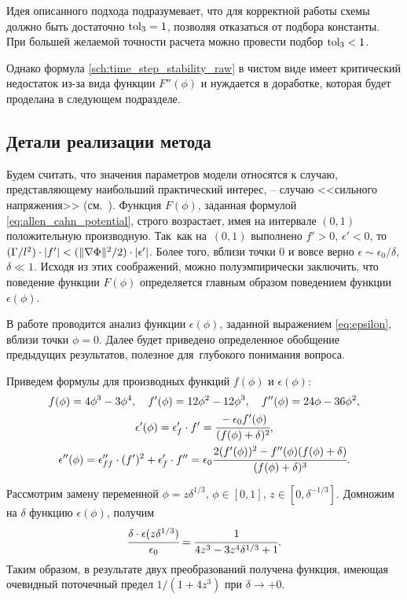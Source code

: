 Идея описанного подхода подразумевает, что для корректной работы схемы должно быть достаточно ${\text{tol}}_3 = 1$, позволяя отказаться от подбора константы. При большей желаемой точности расчета можно провести подбор ${\text{tol}}_3 < 1$.

Однако формула \eqref{sch:time_step_stability_raw} в чистом виде имеет критический недостаток из-за вида функции $F''(\phi)$ и нуждается в доработке, которая будет проделана в следующем подразделе.


\subsection{Детали реализации метода}

Будем считать, что значения параметров модели относятся к случаю, представляющему наибольший практический интерес, -- случаю <<сильного напряжения>> (см.~\cite{ponomarev_stability}). Функция $F(\phi)$, заданная формулой \eqref{eq:allen_cahn_potential}, строго возрастает, имея на интервале $(0, 1)$ положительную производную. Так~как на~$(0, 1)$ выполнено $f' > 0$, $\epsilon' < 0$, то $(\Gamma / l^2) \cdot |f'| \hm < (\norm{\nabla \Phi}^2 / 2) \cdot |\epsilon'|$. Более того, вблизи точки $0$ и вовсе верно $\epsilon \sim \epsilon_0 / \delta$, $\delta \ll 1$. Исходя из этих соображений, можно полуэмпирически заключить, что поведение функции $F(\phi)$ определяется главным образом поведением функции~$\epsilon(\phi)$.

В работе \cite{ponomarev_stability} проводится анализ функции $\epsilon(\phi)$, заданной выражением \eqref{eq:epsilon}, вблизи точки $\phi = 0$. Далее будет приведено определенное обобщение предыдущих результатов, полезное для~глубокого понимания вопроса.

Приведем формулы для производных функций $f(\phi)$ и $\epsilon(\phi)$:
\begin{gather}
	f(\phi) = 4 \phi^3 - 3 \phi^4, \quad f'(\phi) = 12 \phi^2 - 12 \phi^3, \quad f''(\phi) = 24 \phi - 36 \phi^2,
	\nonumber \\
	\epsilon'(\phi) = \epsilon'_f \cdot f' = \cfrac{-\epsilon_0 f'(\phi)}{(f(\phi) + \delta)^2},
	\nonumber \\
	\epsilon''(\phi) = \epsilon''_{ff} \cdot (f')^2 + \epsilon'_f \cdot f'' = \epsilon_0 \cfrac{2 (f'(\phi))^2 - f''(\phi)(f(\phi) + \delta)}{(f(\phi) + \delta)^3}.
	\label{eq:epsilon_phi_phi}
\end{gather}

Рассмотрим замену переменной $\phi = z\delta^{1/3}$, $\phi \in [0, 1]$, $z \in [0, \delta^{-1/3}]$. Домножим на $\delta$ функцию $\epsilon(\phi)$, получим
\[
	\cfrac{\delta \cdot \epsilon(z \delta^{1/3})}{\epsilon_0} = \cfrac{1}{4 z^3 - 3 z^4 \delta^{1/3} + 1}.
\]
Таким образом, в результате двух преобразований получена функция, имеющая очевидный поточечный предел $1/(1 + 4 z^3)$ при $\delta \to +0$.

